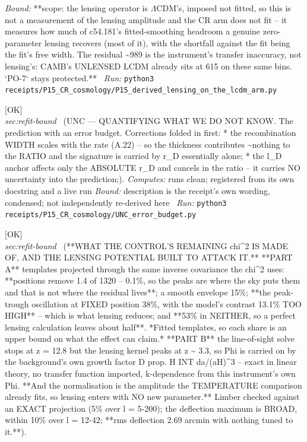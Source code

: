\begin{description}
 \emph{Bound:} **scope: the lensing operator is \ensuremath{\Lambda}CDM's, imposed not fitted, so this is not a measurement of the lensing amplitude and the CR arm does not fit -- it measures how much of c54.181's fitted-smoothing headroom a genuine zero-parameter lensing recovers (most of it), with the shortfall against the fit being the fit's free width. The residual \textasciitilde{}989 is the instrument's transfer inaccuracy, not lensing's: CAMB's UNLENSED LCDM already sits at 615 on these same bins. `PO-7` stays protected.**
\ \emph{Run:} \texttt{python3 receipts/P15\_CR\_cosmology/P15\_derived\_lensing\_on\_the\_lcdm\_arm.py}
\item[\rcptlabel{UNC_error_budget}{P15R75}\textbf{P15R75}\quad\texttt{UNC\_error\_budget}]\hfill\textsf{[OK]}\\
\textit{sec:refit-bound} \ (UNC --- QUANTIFYING WHAT WE DO NOT KNOW. The prediction with an error budget. Corrections folded in first: * the recombination WIDTH scales with the rate (A.22) -- so the thickness contributes \textasciitilde{}nothing to the RATIO and the signature is carried by r\_D essentially alone; * the l\_D anchor affects only the ABSOLUTE r\_D and cancels in the ratio -- it carries NO uncertainty into the prediction;). 
\emph{Computes:} runs clean; registered from its own docstring and a live run
 \emph{Bound:} description is the receipt's own wording, condensed; not independently re-derived here
\ \emph{Run:} \texttt{python3 receipts/P15\_CR\_cosmology/UNC\_error\_budget.py}
\item[\rcptlabel{P15_the_residual_is_contrast_and_the_lensing_potential_is_derived}{P15R76}\textbf{P15R76}\quad\texttt{P15\_the\_residual\_is\_contrast\_and\_the\_lensing\_potential\_is\_derived}]\hfill\textsf{[OK]}\\
\textit{sec:refit-bound} \ (**WHAT THE CONTROL'S REMAINING chi\textasciicircum{}2 IS MADE OF, AND THE LENSING POTENTIAL BUILT TO ATTACK IT.** **PART A** templates projected through the same inverse covariance the chi\textasciicircum{}2 uses: **positions remove 1.4 of 1320 -- 0.1\%, so the peaks are where the sky puts them and that is not where the residual lives**; a smooth envelope 15\%; **the peak-trough oscillation at FIXED position 38\%, with the model's contrast 13.1\% TOO HIGH** -- which is what lensing reduces; and **53\% in NEITHER, so a perfect lensing calculation leaves about half**. *Fitted templates, so each share is an upper bound on what the effect can claim.* **PART B** the line-of-sight solve stops at z = 12.8 but the lensing kernel peaks at z \textasciitilde{} 3.3, so Phi is carried on by the background's own growth factor D prop. H INT da/(aH)\textasciicircum{}3 -- exact in linear theory, no transfer function imported, k-dependence from this instrument's own Phi. **And the normalisation is the amplitude the TEMPERATURE comparison already fits, so lensing enters with NO new parameter.** Limber checked against an EXACT projection (5\% over l = 5-200); the deflection maximum is BROAD, within 10\% over l = 12-42; **rms deflection 2.69 arcmin with nothing tuned to it.**). 

\end{description}
